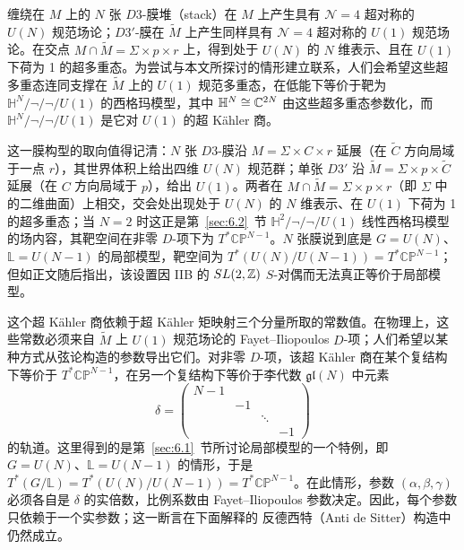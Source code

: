 缠绕在 $M$ 上的 $N$ 张 $D3$-膜堆（stack）在 $M$ 上产生具有 ${\mathcal N}=4$ 超对称的 $U(N)$ 规范场论；$D3'$-膜在 $\tilde M$ 上产生同样具有 ${\mathcal N}=4$ 超对称的 $U(1)$ 规范场论。在交点 $M\cap \tilde M=\Sigma\times p\times r$ 上，得到处于 $U(N)$ 的 $N$ 维表示、且在 $U(1)$ 下荷为 1 的超多重态。为尝试与本文所探讨的情形建立联系，人们会希望这些超多重态连同支撑在 $\tilde M$ 上的 $U(1)$ 规范多重态，在低能下等价于靶为 $\mathbb{H}^N/\neg/\neg/U(1)$ 的西格玛模型，其中 $\mathbb{H}^N\cong {\mathbb{C}}^{2N}$ 由这些超多重态参数化，而 $\mathbb{H}^N/\neg/\neg/U(1)$ 是它对 $U(1)$ 的超 Kähler 商。

\begin{yizhu}[物理图像补充]这一膜构型的取向值得记清：$N$ 张 $D3$-膜沿 $M=\Sigma\times C\times r$ 延展（在 $\tilde C$ 方向局域于一点 $r$），其世界体积上给出四维 $U(N)$ 规范群；单张 $D3'$ 沿 $\tilde M=\Sigma\times p\times\tilde C$ 延展（在 $C$ 方向局域于 $p$），给出 $U(1)$。两者在 $M\cap\tilde M=\Sigma\times p\times r$（即 $\Sigma$ 中的二维曲面）上相交，交会处出现处于 $U(N)$ 的 $N$ 维表示、在 $U(1)$ 下荷为 1 的超多重态；当 $N=2$ 时这正是第~\ref{sec:6.2}~节 $\mathbb{H}^2/\neg/\neg/U(1)$ 线性西格玛模型的场内容，其靶空间在非零 $D$-项下为 $T^*\mathbb{CP}^{N-1}$。$N$ 张膜说到底是 $G=U(N)$、$\mathbb{L}=U(N-1)$ 的局部模型，靶空间为 $T^*(U(N)/U(N-1))=T^*\mathbb{CP}^{N-1}$；但如正文随后指出，该设置因 IIB 的 $SL(2,{\mathbb{Z}})$ $S$-对偶而无法真正等价于局部模型。\end{yizhu}

这个超 Kähler 商依赖于超 Kähler 矩映射三个分量所取的常数值。在物理上，这些常数必须来自 $\tilde M$ 上 $U(1)$ 规范场论的 Fayet–Iliopoulos $D$-项；人们希望以某种方式从弦论构造的参数导出它们。对非零 $D$-项，该超 Kähler 商在某个复结构下等价于 $T^*\mathbb{CP}^{N-1}$，在另一个复结构下等价于李代数 ${\mathfrak{gl}}(N)$ 中元素
\setcounter{equation}{22}
\begin{equation}\label{eq:6.23}
  \delta= \left(\begin{matrix}N-1&&&\\
                 & -1&& \\
                 &&\ddots&\\
                  &&&-1\end{matrix}\right)
\end{equation}
的轨道。这里得到的是第~\ref{sec:6.1}~节所讨论局部模型的一个特例，即 $G=U(N)$、$\mathbb{L}=U(N-1)$ 的情形，于是 $T^*(G/\mathbb{L})=T^*(U(N)/U(N-1))=T^*\mathbb{CP}^{N-1}$。在此情形，参数 $(\alpha,\beta,\gamma)$ 必须各自是 $\delta$ 的实倍数，比例系数由 Fayet–Iliopoulos 参数决定。因此，每个参数只依赖于一个实参数；这一断言在下面解释的 反德西特（Anti de Sitter）构造中仍然成立。

